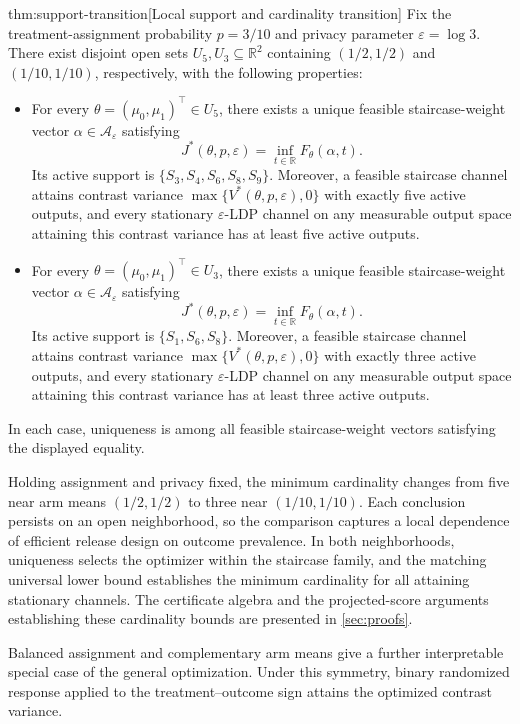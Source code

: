 \begin{theoremv}{thm:support-transition}[Local support and cardinality transition]
Fix the treatment-assignment probability \(p=3/10\) and privacy parameter \(\varepsilon=\log 3\). There exist disjoint open sets \(U_5,U_3\subseteq\mathbb R^2\) containing \((1/2,1/2)\) and \((1/10,1/10)\), respectively, with the following properties:
\begin{itemize}
\item For every \(\theta=(\mu_0,\mu_1)^\top\in U_5\), there exists a unique feasible staircase-weight vector \(\alpha\in\mathcal A_\varepsilon\) satisfying
\[
J^*(\theta,p,\varepsilon)
=
\inf_{t\in\mathbb R}F_\theta(\alpha,t).
\]
Its active support is \(\{S_3,S_4,S_6,S_8,S_9\}\). Moreover, a feasible staircase channel attains contrast variance \(\max\{V^*(\theta,p,\varepsilon),0\}\) with exactly five active outputs, and every stationary \(\varepsilon\)-LDP channel on any measurable output space attaining this contrast variance has at least five active outputs.
\item For every \(\theta=(\mu_0,\mu_1)^\top\in U_3\), there exists a unique feasible staircase-weight vector \(\alpha\in\mathcal A_\varepsilon\) satisfying
\[
J^*(\theta,p,\varepsilon)
=
\inf_{t\in\mathbb R}F_\theta(\alpha,t).
\]
Its active support is \(\{S_1,S_6,S_8\}\). Moreover, a feasible staircase channel attains contrast variance \(\max\{V^*(\theta,p,\varepsilon),0\}\) with exactly three active outputs, and every stationary \(\varepsilon\)-LDP channel on any measurable output space attaining this contrast variance has at least three active outputs.
\end{itemize}
In each case, uniqueness is among all feasible staircase-weight vectors satisfying the displayed equality.
\end{theoremv}

Holding assignment and privacy fixed, the minimum cardinality changes from five near arm means \((1/2,1/2)\) to three near \((1/10,1/10)\). Each conclusion persists on an open neighborhood, so the comparison captures a local dependence of efficient release design on outcome prevalence. In both neighborhoods, uniqueness selects the optimizer within the staircase family, and the matching universal lower bound establishes the minimum cardinality for all attaining stationary channels. The certificate algebra and the projected-score arguments establishing these cardinality bounds are presented in \cref{sec:proofs}.

Balanced assignment and complementary arm means give a further interpretable special case of the general optimization. Under this symmetry, binary randomized response applied to the treatment--outcome sign attains the optimized contrast variance.

